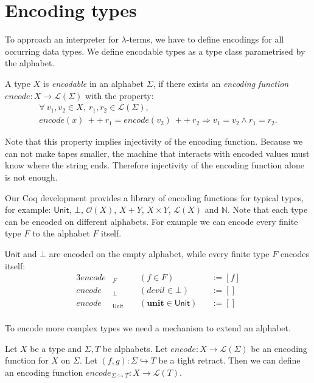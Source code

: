 \documentclass{psartcl}
\newcommand{\app}{~ ++ ~}
\newcommand{\from}{:}
\renewcommand{\to}{\rightarrow}
\newcommand{\Opt}{\mathcal{O}}
\newcommand{\Nat}{\mathbb{N}}
\newcommand{\Unit}{\mathsf{Unit}}
\newcommand{\List}{\mathcal{L}}
\newcommand{\unit}{\mathbf{unit}}
\newcommand{\Tau}{T}
\begin{document}
\section{Encoding types}
\label{sec:encode}

To approach an interpreter for $\lambda$-terms, we have to define encodings for all occurring data types.
We define encodable types as a type class parametrised by the alphabet.

\begin{definition}
  \label{def:code}
  A type $X$ is \emph{encodable} in an alphabet $\Sigma$, if there exists an \emph{encoding function}
  $encode \from X \to \List(\Sigma)$ with the property:
  \begin{multline*}
    \forall~v_1,v_2 \in X,~r_1,r_2 \in \List(\Sigma), \\
    encode(x) \app r_1 = encode(v_2) \app r_2 \Rightarrow
    v_1 = v_2 \land r_1 = r_2.
  \end{multline*}
\end{definition}
Note that this property implies injectivity of the encoding function.  Because we can not make tapes smaller, the machine that interacts with encoded
values must know where the string ends.  Therefore injectivity of the encoding function alone is not enough.

Our Coq development provides a library of encoding functions for typical types, for example:  $\Unit$, $\bot$, $\Opt(X)$, $X+Y$, $X \times Y$, $\List(X)$
and $\Nat$.  Note that each type can be encoded on different alphabets.  For example we can encode every finite type $F$ to the alphabet $F$ itself.

\begin{example}
  \label{ex:bacic-code}
  $\Unit$ and $\bot$ are encoded on the empty alphabet, while every finite type $F$ encodes itself:
  \begin{alignat*}{3}
    encode&_F    &&~(f \in F)         &&:= [f] \\
    encode&_\bot &&~(devil \in \bot)  &&:= [] \\
    encode&_\Unit&&~(\unit \in \Unit) &&:= [] \\
  \end{alignat*}
\end{example}

To encode more complex types we need a mechanism to extend an alphabet.
\begin{lemma}
  \label{lem:code-map}
  Let $X$ be a type and $\Sigma, \Tau$ be alphabets.
  Let $encode \from X \to \List(\Sigma)$ be an encoding function for $X$ on $\Sigma$.
  Let $(f,g) \from \Sigma \hookrightarrow \Tau$ be a tight retract.
  Then we can define an encoding function $encode_{\Sigma \hookrightarrow \Tau} \from X \to \List(\Tau)$.
\end{lemma}
\end{document}
